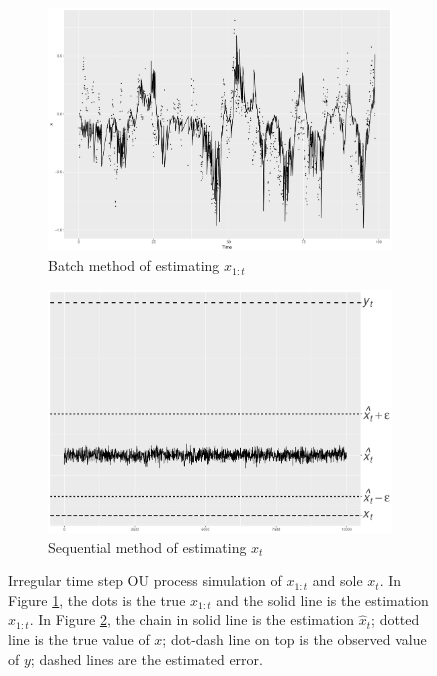 \begin{figure}[h]
\centering
\begin{subfigure}[h]{0.45\textwidth}
\includegraphics[width=\textwidth]{Chapters/05MCMCOU/plots/simudataOUallX.pdf}
\caption{Batch method of estimating $x_{1:t}$}\label{MCMCOUallX}
\end{subfigure}
\begin{subfigure}[h]{0.45\textwidth}
\includegraphics[width=\textwidth]{Chapters/05MCMCOU/plots/simudataOUXt2.pdf}
\caption{Sequential method of estimating $x_t$}\label{MCMCOUallXt2}
\end{subfigure}
\caption{Irregular time step OU process simulation of $x_{1:t}$ and sole $x_t$. In Figure \ref{MCMCOUallX}, the dots is the true $x_{1:t}$ and the solid line is the estimation $\hat{x}_{1:t}$. In Figure \ref{MCMCOUallXt2}, the chain in solid line is the estimation $\hat{x}_t$; dotted line is the true value of $x$; dot-dash line on top is the observed value of $y$; dashed lines are the estimated error. }
\label{simuOUxt}
\end{figure}




